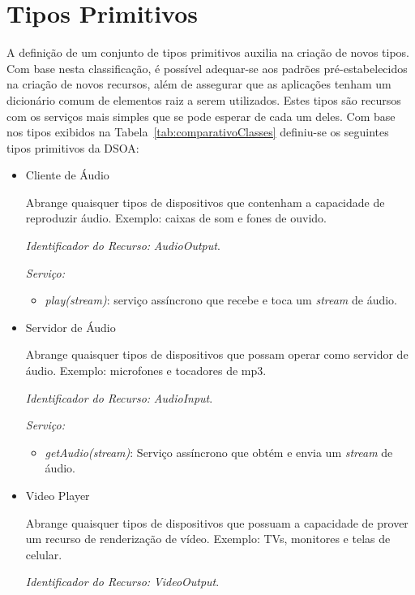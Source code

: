 \section{Tipos Primitivos}
\label{sec:tiposBasicos}

A definição de um conjunto de tipos primitivos auxilia na criação de novos tipos. Com base nesta classificação, é possível adequar-se aos padrões pré-estabelecidos na criação de novos recursos, além de assegurar que as aplicações tenham um dicionário comum de elementos raiz a serem utilizados. Estes tipos são recursos com os serviços mais simples que se pode esperar de cada um deles. Com base nos tipos exibidos na Tabela~\ref{tab:comparativoClasses} definiu-se os seguintes tipos primitivos da DSOA:

\begin{itemize}
	\item Cliente de Áudio
		
		Abrange quaisquer tipos de dispositivos que contenham a capacidade de reproduzir áudio. Exemplo: caixas de som e fones de ouvido.

		\emph{Identificador do Recurso:} \emph{AudioOutput}.

		\emph{Serviço:}
		\begin{itemize}
			\item \emph{play(stream)}: serviço assíncrono que recebe e toca um \emph{stream} de áudio.
		\end{itemize}

	\item Servidor de Áudio
		
		Abrange quaisquer tipos de dispositivos que possam operar como servidor de áudio. Exemplo: microfones e tocadores de mp3.

		\emph{Identificador do Recurso:} \emph{AudioInput}.

		\emph{Serviço:}
		\begin{itemize}
			\item \emph{getAudio(stream)}: Serviço assíncrono que obtém e envia um \emph{stream} de áudio.
		\end{itemize}

	\item Video Player
		
		Abrange quaisquer tipos de dispositivos que possuam a capacidade de prover um recurso de renderização de vídeo. Exemplo: TVs, monitores e telas de celular.

		\emph{Identificador do Recurso:} \emph{VideoOutput}.


\end{itemize}
